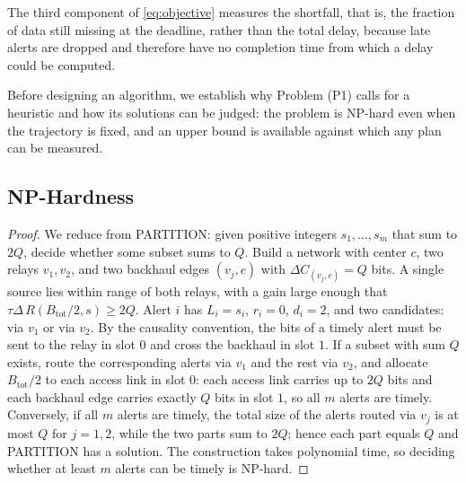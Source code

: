 \begin{remark}
The third component of \eqref{eq:objective} measures the shortfall, that is, the fraction of data still missing at the deadline, rather than the total delay, because late alerts are dropped and therefore have no completion time from which a delay could be computed.
\end{remark}

\label{sec:analysis}
Before designing an algorithm, we establish why Problem (P1) calls for a heuristic and how its solutions can be judged: the problem is NP-hard even when the trajectory is fixed, and an upper bound is available against which any plan can be measured.

\subsection{NP-Hardness}
\label{sec:hardness}


\begin{proof}
We reduce from PARTITION: given positive integers $s_1,\dots,s_m$ that sum to $2Q$, decide whether some subset sums to $Q$. Build a network with center $c$, two relays $v_1,v_2$, and two backhaul edges $(v_j,c)$ with $\Delta C_{(v_j,c)}=Q$ bits. A single source lies within range of both relays, with a gain large enough that $\tau\Delta\,R(B_{\mathrm{tot}}/2,s)\ge 2Q$. Alert $i$ has $L_i=s_i$, $r_i=0$, $d_i=2$, and two candidates: via $v_1$ or via $v_2$. By the causality convention, the bits of a timely alert must be sent to the relay in slot $0$ and cross the backhaul in slot $1$.
If a subset with sum $Q$ exists, route the corresponding alerts via $v_1$ and the rest via $v_2$, and allocate $B_{\mathrm{tot}}/2$ to each access link in slot $0$: each access link carries up to $2Q$ bits and each backhaul edge carries exactly $Q$ bits in slot $1$, so all $m$ alerts are timely.
Conversely, if all $m$ alerts are timely, the total size of the alerts routed via $v_j$ is at most $Q$ for $j=1,2$, while the two parts sum to $2Q$; hence each part equals $Q$ and PARTITION has a solution. The construction takes polynomial time, so deciding whether at least $m$ alerts can be timely is NP-hard.
\end{proof}

